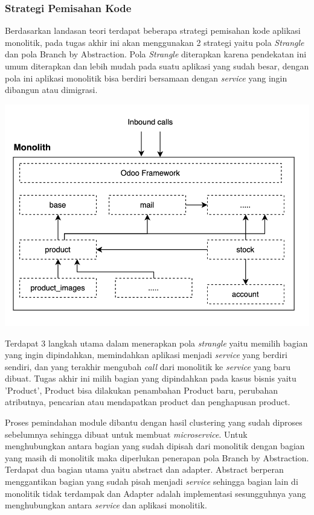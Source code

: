 \subsubsection{Strategi Pemisahan Kode}
Berdasarkan landasan teori terdapat beberapa strategi pemisahan kode aplikasi monolitik, pada tugas akhir ini akan menggunakan 2 strategi yaitu pola \textit{Strangle} dan pola Branch by Abstraction. Pola \textit{Strangle} diterapkan karena pendekatan ini umum diterapkan dan lebih mudah pada suatu aplikasi yang sudah besar, dengan pola ini aplikasi monolitik bisa berdiri bersamaan dengan \textit{service} yang ingin dibangun atau dimigrasi. 

\begin{center}
	\includegraphics[width=14cm]{img/bab_3/strangelExMono.png}
	\label{fig:asd}
\end{center}

Terdapat 3 langkah utama dalam menerapkan pola \textit{strangle} yaitu memilih bagian yang ingin dipindahkan, memindahkan aplikasi menjadi \textit{service} yang berdiri sendiri, dan yang terakhir mengubah \textit{call} dari monolitik ke \textit{service} yang baru dibuat. Tugas akhir ini milih bagian yang dipindahkan pada kasus bisnis yaitu 'Product', Product bisa dilakukan penambahan Product baru, perubahan atributnya, pencarian atau mendapatkan product dan penghapusan product.

Proses pemindahan module dibantu dengan hasil clustering yang sudah diproses sebelumnya sehingga dibuat untuk membuat \textit{microservice}. Untuk menghubungkan antara bagian yang sudah dipisah dari monolitik dengan bagian yang masih di monolitik maka diperlukan penerapan pola Branch by Abstraction. Terdapat dua bagian utama yaitu abstract dan adapter. Abstract berperan menggantikan bagian yang sudah pisah menjadi \textit{service} sehingga bagian lain di monolitik tidak terdampak dan Adapter adalah implementasi sesungguhnya yang menghubungkan antara \textit{service} dan aplikasi monolitik.

